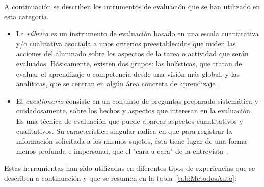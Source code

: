A continuación se describen los intrumentos de evaluación que se han utilizado en esta categoría.

\begin{itemize}
\item La \emph{rúbrica} es un instrumento de evaluación basado en una escala cuantitativa y/o cualitativa asociada a unos criterios preestablecidos que miden las acciones del alumnado sobre los aspectos de la tarea o actividad que serán evaluados.  Básicamente, existen dos grupos: las holísticas, que tratan
de evaluar el aprendizaje o competencia desde una visión más global, y las analíticas, que se centran en algún área concreta de aprendizaje~\cite{torres2010rubrica}.
\item El \emph{cuestionario} consiste en un conjunto de preguntas preparado sistemática y cuidadosamente, sobre los hechos y aspectos que interesan en la evaluación.  Es una técnica de evaluación que puede abarcar aspectos cuantitativos y cualitativos. Su característica singular radica en que para registrar la información solicitada a los mismos sujetos, ésta tiene lugar de una forma menos profunda e impersonal, que el "cara a cara" de la entrevista~\cite{munoz2003cuestionario}. 
\end{itemize}

Estas herramientas han sido utilizadas en diferentes tipos de experiencias que se describen a continuación y que se resumen en la tabla~\ref{tab:MetodosAuto}:

